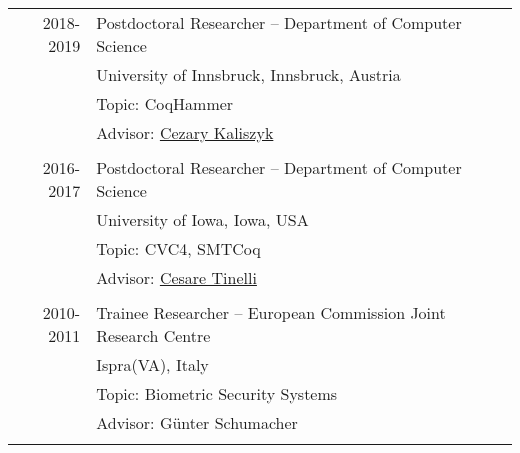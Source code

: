 \documentclass[a4paper,9pt]{article} %
\begin{document}
\begin{tabular}{r|p{13cm}}
\textsc{2018-2019} & Postdoctoral Researcher -- {Department of Computer Science} \\
& {University of Innsbruck,  Innsbruck, Austria} \\
& Topic: CoqHammer\\
& Advisor: \href{http://cl-informatik.uibk.ac.at/cek/}{Cezary Kaliszyk}\\
\multicolumn{2}{c}{} \\

\textsc{2016-2017} & Postdoctoral Researcher -- {Department of Computer Science} \\
& {University of Iowa,  Iowa, USA} \\
& Topic: CVC4, SMTCoq\\
& Advisor: \href{https://homepage.cs.uiowa.edu/~tinelli/}{Cesare Tinelli}\\
\multicolumn{2}{c}{} \\

\textsc{2010-2011} & Trainee Researcher -- {European Commission Joint Research Centre} \\
& {Ispra(VA), Italy} \\
& Topic: Biometric Security Systems\\
& Advisor: {Günter Schumacher}\\
\multicolumn{2}{c}{} \\

\end{tabular}

\end{document}
